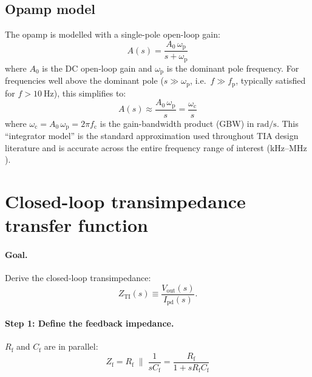 \documentclass[a4paper,11pt]{article}
\begin{document}
\subsection{Opamp model}

The opamp is modelled with a single-pole open-loop gain:
\begin{equation}
  A(s) = \frac{A_0 \,\omega_{\mathrm{p}}}{s + \omega_{\mathrm{p}}}
  \label{eq:opamp-full}
\end{equation}
where $A_0$ is the DC open-loop gain and $\omega_{\mathrm{p}}$ is the
dominant pole frequency.  For frequencies well above the dominant pole
($s \gg \omega_{\mathrm{p}}$, i.e.\ $f \gg f_{\mathrm{p}}$, typically
satisfied for $f > \SI{10}{\hertz}$), this simplifies to:
\begin{equation}
  A(s) \approx \frac{A_0 \,\omega_{\mathrm{p}}}{s}
  = \frac{\omega_{\mathrm{c}}}{s}
  \label{eq:opamp-integrator}
\end{equation}
where $\omega_{\mathrm{c}} = A_0\,\omega_{\mathrm{p}} = 2\pi
f_{\mathrm{c}}$ is the gain-bandwidth product (GBW) in
$\si{\radian\per\second}$.  This ``integrator model'' is the standard
approximation used throughout TIA design literature and is accurate
across the entire frequency range of interest
($\si{\kilo\hertz}$--$\si{\mega\hertz}$).

\section{Closed-loop transimpedance transfer function}
\label{sec:transfer-function}

\paragraph{Goal.}
Derive the closed-loop transimpedance:
\begin{equation*}
  Z_{\mathrm{TI}}(s)
  \equiv \frac{V_{\mathrm{out}}(s)}{I_{\mathrm{pd}}(s)}.
\end{equation*}

\paragraph{Step 1: Define the feedback impedance.}

$R_{\mathrm{f}}$ and $C_{\mathrm{f}}$ are in parallel:
\begin{equation}
  Z_{\mathrm{f}}
  = R_{\mathrm{f}} \;\|\; \frac{1}{sC_{\mathrm{f}}}
  = \frac{R_{\mathrm{f}}}{1 + sR_{\mathrm{f}}C_{\mathrm{f}}}
  \label{eq:Zf}
\end{equation}
\end{document}
